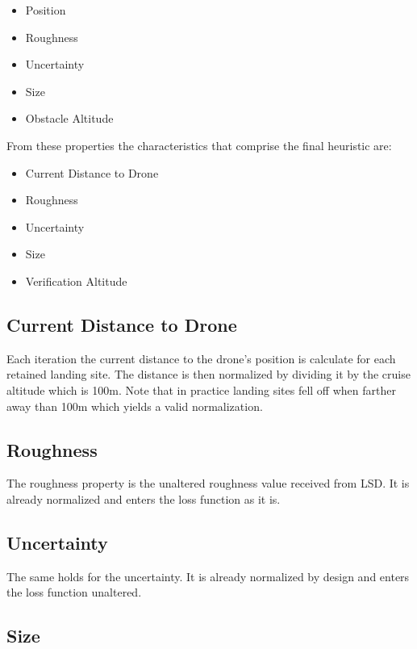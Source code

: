 \begin{itemize}
    \item Position
    \item Roughness
    \item Uncertainty
    \item Size
    \item Obstacle Altitude
\end{itemize}

From these properties the characteristics that comprise the final heuristic are:

\begin{itemize}
    \item Current Distance to Drone
    \item Roughness
    \item Uncertainty
    \item Size
    \item Verification Altitude
\end{itemize}

\subsection{Current Distance to Drone}

Each iteration the current distance to the drone's position is calculate for each retained landing site. The distance is then normalized by dividing it by the cruise altitude which is 100m. Note that in practice landing sites fell off when farther away than 100m which yields a valid normalization. %

\subsection{Roughness}

The roughness property is the unaltered roughness value received from LSD. It is already normalized and enters the loss function as it is. 

\subsection{Uncertainty}

The same holds for the uncertainty. It is already normalized by design and enters the loss function unaltered.

\subsection{Size}

